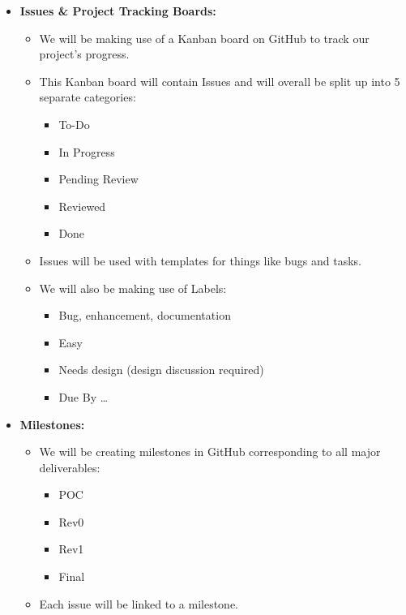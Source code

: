 \documentclass{article}
\begin{document}
\begin{itemize}
    \item \textbf{Issues \& Project Tracking Boards:}
    \begin{itemize}
        \item We will be making use of a Kanban board on GitHub to track our project’s progress.
        \item This Kanban board will contain Issues and will overall be split up into 5 separate categories:
        \begin{itemize}
            \item To-Do
            \item In Progress
            \item Pending Review
            \item Reviewed
            \item Done
        \end{itemize}
        \item Issues will be used with templates for things like bugs and tasks.
        \item We will also be making use of Labels:
        \begin{itemize}
            \item Bug, enhancement, documentation
            \item Easy
            \item Needs design (design discussion required)
            \item Due By \dots
        \end{itemize}
    \end{itemize}

    \item \textbf{Milestones:}
    \begin{itemize}
        \item We will be creating milestones in GitHub corresponding to all major deliverables:
        \begin{itemize}
            \item POC
            \item Rev0
            \item Rev1
            \item Final
        \end{itemize}
        \item Each issue will be linked to a milestone.
    \end{itemize}


\end{itemize}
\end{document}
